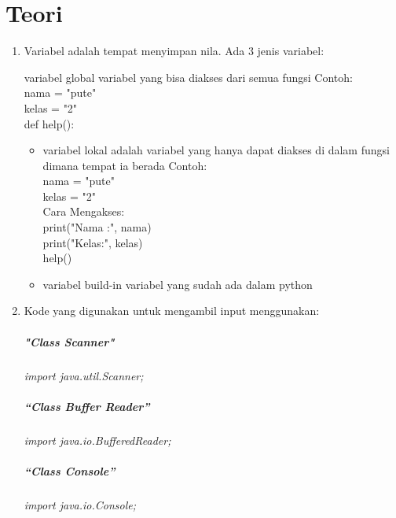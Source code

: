 \chapter*{Teori}

\begin{enumerate}
	\item Variabel adalah tempat menyimpan nila. Ada 3 jenis variabel:
	\begin{itemize}
	variabel global variabel yang bisa diakses dari semua fungsi Contoh:\\
	nama = "pute"\\
	kelas = "2"\\
	  def help():\\
	\end{itemize}
	
	\begin{itemize}
	\item variabel lokal adalah variabel yang hanya dapat diakses di dalam fungsi dimana tempat ia berada 	Contoh:\\
	nama = "pute"\\
	kelas = "2"\\ 
	Cara Mengakses:\\
	print("Nama :", nama)\\
	print("Kelas:", kelas)\\
	help()\\
	\end{itemize}
	
	\begin{itemize}
	\item variabel build-in variabel yang sudah ada dalam python
	\end{itemize}
	
	
	
	\item Kode yang digunakan untuk mengambil input menggunakan:
	\paragraph{\textit{"Class Scanner"}}
	\textit{import java.util.Scanner;}
	\paragraph{\textit{“Class Buffer Reader”}}
	\textit{import java.io.BufferedReader;}
	\paragraph{\textit{“Class Console”}}
	\textit{import java.io.Console;}

\end{enumerate}
